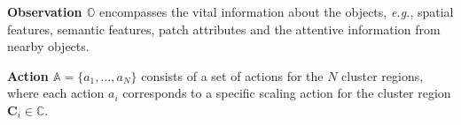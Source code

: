\documentclass[letterpaper]{article} %
\def \eg {\emph{e.g.}}
\def \ie {\emph{i.e.}}
\newcommand\blue[1]{\textcolor{blue}{#1}}
\newcommand\rjf[1]{\textcolor{red}{\{RJF: #1\}}}
\begin{document}

\noindent\textbf{Observation $\mathbb{O}$} encompasses the vital information about the objects, \eg, spatial features, semantic features, patch attributes and the attentive information from nearby objects. %




\noindent\textbf{Action $\mathbb{A} = \{a_1, \dots, a_N\}$} 
consists of a set of actions for the $N$ cluster regions, where each action $a_i$ corresponds to a specific scaling action for the cluster region $\bm{C}_i\in\mathbb{C}$. %
\end{document}
